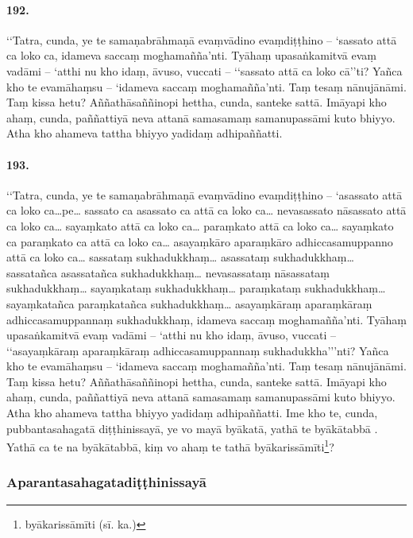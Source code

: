 \paragraph{192.} ‘‘Tatra, cunda, ye te samaṇabrāhmaṇā evaṃvādino evaṃdiṭṭhino – ‘sassato attā ca loko ca, idameva saccaṃ moghamañña’nti. Tyāhaṃ upasaṅkamitvā evaṃ vadāmi – ‘atthi nu kho idaṃ, āvuso, vuccati – ‘‘sassato attā ca loko cā’’ti? Yañca kho te evamāhaṃsu – ‘idameva saccaṃ moghamañña’nti. Taṃ tesaṃ nānujānāmi. Taṃ kissa hetu? Aññathāsaññinopi hettha, cunda, santeke sattā. Imāyapi kho ahaṃ, cunda, paññattiyā neva attanā samasamaṃ samanupassāmi kuto bhiyyo. Atha kho ahameva tattha bhiyyo yadidaṃ adhipaññatti.

\paragraph{193.} ‘‘Tatra, cunda, ye te samaṇabrāhmaṇā evaṃvādino evaṃdiṭṭhino – ‘asassato attā ca loko ca…pe… sassato ca asassato ca attā ca loko ca… nevasassato nāsassato attā ca loko ca… sayaṃkato attā ca loko ca… paraṃkato attā ca loko ca… sayaṃkato ca paraṃkato ca attā ca loko ca… asayaṃkāro aparaṃkāro adhiccasamuppanno attā ca loko ca… sassataṃ sukhadukkhaṃ… asassataṃ sukhadukkhaṃ… sassatañca asassatañca sukhadukkhaṃ… nevasassataṃ nāsassataṃ sukhadukkhaṃ… sayaṃkataṃ sukhadukkhaṃ… paraṃkataṃ sukhadukkhaṃ… sayaṃkatañca paraṃkatañca sukhadukkhaṃ… asayaṃkāraṃ aparaṃkāraṃ adhiccasamuppannaṃ sukhadukkhaṃ, idameva saccaṃ moghamañña’nti. Tyāhaṃ upasaṅkamitvā evaṃ vadāmi – ‘atthi nu kho idaṃ, āvuso, vuccati – ‘‘asayaṃkāraṃ aparaṃkāraṃ adhiccasamuppannaṃ sukhadukkha’’’nti? Yañca kho te evamāhaṃsu – ‘idameva saccaṃ moghamañña’nti. Taṃ tesaṃ nānujānāmi. Taṃ kissa hetu? Aññathāsaññinopi hettha, cunda, santeke sattā. Imāyapi kho ahaṃ, cunda, paññattiyā neva attanā samasamaṃ samanupassāmi kuto bhiyyo. Atha kho ahameva tattha bhiyyo yadidaṃ adhipaññatti. Ime kho te, cunda, pubbantasahagatā diṭṭhinissayā, ye vo mayā byākatā, yathā te byākātabbā . Yathā ca te na byākātabbā, kiṃ vo ahaṃ te tathā byākarissāmīti\footnote{byākarissāmīti (sī. ka.)}?

\subsubsection{Aparantasahagatadiṭṭhinissayā}

